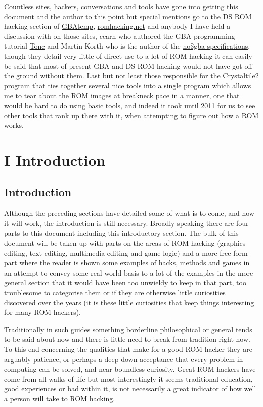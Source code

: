 \documentclass[
]{book}
\begin{document}
Countless sites, hackers, conversations and tools have gone into getting this document and the author to this point but special mentions go to the DS ROM hacking section of \href{https://gbatemp.net/forum/41-nds-rom-hacking-and-translations/}{GBAtemp}, \href{http://www.romhacking.net/}{romhacking.net} and anybody I have held a discussion with on those sites, cearn who authored the GBA programming tutorial \href{http://www.coranac.com/tonc/text/toc.htm}{Tonc} and Martin Korth who is the author of the \href{http://problemkaputt.de/gbatek.htm}{no\$gba specifications,} though they detail very little of direct use to a lot of ROM hacking it can easily be said that most of present GBA and DS ROM hacking would not have got off the ground without them. Last but not least those responsible for the Crystaltile2 program that ties together several nice tools into a single program which allows me to tear about the ROM images at breakneck pace in a manner, one that would be hard to do using basic tools, and indeed it took until 2011 for us to see other tools that rank up there with it, when attempting to figure out how a ROM works.

\hypertarget{part-i-introduction}{%
\part{I Introduction}\label{part-i-introduction}}

\hypertarget{introduction}{%
\chapter{Introduction}\label{introduction}}

Although the preceding sections have detailed some of what is to come, and how it will work, the introduction is still necessary. Broadly speaking there are four parts to this document including this introductory section. The bulk of this document will be taken up with parts on the areas of ROM hacking (graphics editing, text editing, multimedia editing and game logic) and a more free form part where the reader is shown some examples of hacks, methods and games in an attempt to convey some real world basis to a lot of the examples in the more general section that it would have been too unwieldy to keep in that part, too troublesome to categorise them or if they are otherwise little curiosities discovered over the years (it is these little curiosities that keep things interesting for many ROM hackers).

Traditionally in such guides something borderline philosophical or general tends to be said about now and there is little need to break from tradition right now. To this end concerning the qualities that make for a good ROM hacker they are arguably patience, or perhaps a deep down acceptance that every problem in computing can be solved, and near boundless curiosity. Great ROM hackers have come from all walks of life but most interestingly it seems traditional education, good experiences or bad within it, is not necessarily a great indicator of how well a person will take to ROM hacking.
\end{document}
